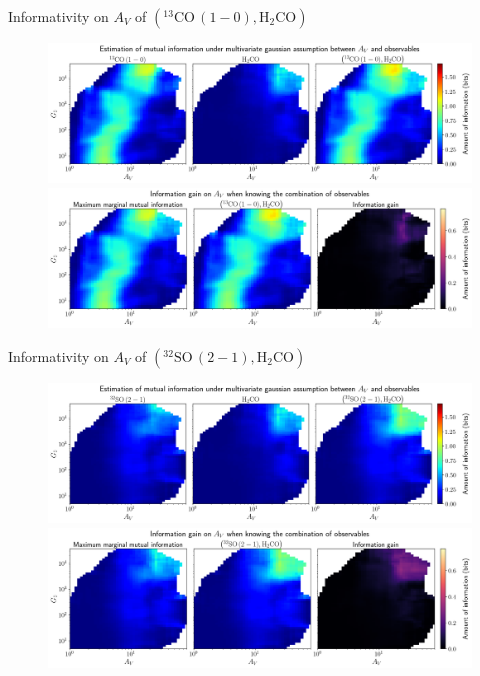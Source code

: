 \documentclass{beamer}
\begin{document}
\begin{frame}{Informativity on $A_V$ of $\left(\mathrm{^{13}CO\,(1-0)},\mathrm{H_2CO}\right)$}
    \begin{figure}
        \centering
        \includegraphics[width=0.95\linewidth]{../linearinfo/av__13co10_h2co_linearinfo.png}
        \vfill
        \includegraphics[width=0.95\linewidth]{../linearinfo/av__13co10_h2co_linearinfo_gain.png}
    \end{figure}
\end{frame}

\begin{frame}{Informativity on $A_V$ of $\left(\mathrm{^{32}SO\,(2-1)},\mathrm{H_2CO}\right)$}
    \begin{figure}
        \centering
        \includegraphics[width=0.95\linewidth]{../linearinfo/av__32so21_h2co_linearinfo.png}
        \vfill
        \includegraphics[width=0.95\linewidth]{../linearinfo/av__32so21_h2co_linearinfo_gain.png}
    \end{figure}
\end{frame}
\end{document}
